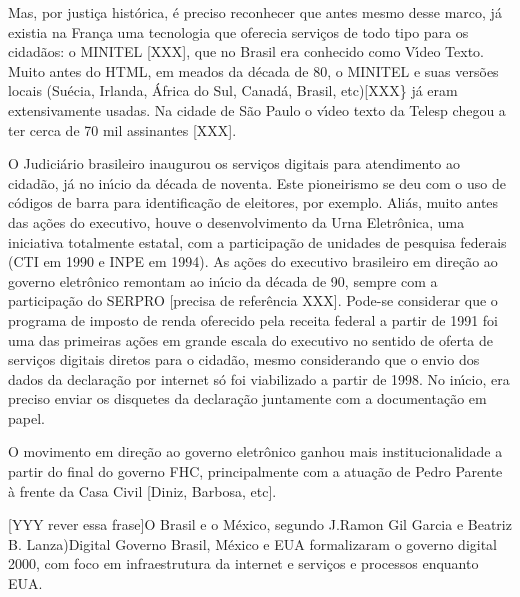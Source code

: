 \documentclass[
12pt,		%
openright,	%
twoside,  %
a4paper,			%
chapter=TITLE,		%
english,			%
french,				%
spanish,			%
brazil				%
]{USPSC-classe/USPSC_RedarTex}
\begin{document}
Mas, por justi\c{c}a hist\'orica, \'e preciso reconhecer que antes mesmo desse marco, j\'a existia na Fran\c{c}a uma tecnologia que oferecia servi\c{c}os de todo tipo para os cidad\~aos: o MINITEL [XXX], que no Brasil era conhecido como V\'{\i}deo Texto. Muito antes do HTML, em meados da d\'ecada de 80, o MINITEL e suas vers\~oes locais (Su\'ecia, Irlanda, \'Africa do Sul, Canad\'a, Brasil, etc)[XXX\} j\'a eram extensivamente usadas. Na cidade de S\~ao Paulo o v\'{\i}deo texto da Telesp chegou a ter cerca de 70 mil assinantes [XXX].








O Judici\'ario brasileiro inaugurou os servi\c{c}os digitais para atendimento ao cidad\~ao, j\'a no in\'{\i}cio da d\'ecada de noventa. Este pioneirismo se deu com o uso de c\'odigos de barra para identifica\c{c}\~ao de eleitores, por exemplo. Ali\'as, muito antes das a\c{c}\~oes do executivo, houve o desenvolvimento da Urna Eletr\^onica, uma iniciativa totalmente estatal, com a participa\c{c}\~ao de unidades de pesquisa federais (CTI em 1990 e INPE em 1994). As a\c{c}\~oes do executivo brasileiro em dire\c{c}\~ao ao governo eletr\^onico remontam ao in\'{\i}cio da d\'ecada de 90, sempre com a participa\c{c}\~ao do SERPRO [precisa de refer\^encia XXX]. Pode-se considerar que o programa de imposto de renda oferecido pela receita federal a partir de 1991 foi uma das primeiras a\c{c}\~oes em grande escala do executivo no sentido de oferta de servi\c{c}os digitais diretos para o cidad\~ao, mesmo considerando que o envio dos dados da declara\c{c}\~ao por internet s\'o foi viabilizado a partir de 1998. No in\'{\i}cio, era preciso enviar os disquetes da declara\c{c}\~ao juntamente com a documenta\c{c}\~ao em papel.








O movimento em dire\c{c}\~ao ao governo eletr\^onico ganhou mais institucionalidade a partir do final do governo FHC, principalmente com a atua\c{c}\~ao de Pedro Parente \`a frente da Casa Civil [Diniz, Barbosa, etc].








[YYY rever essa frase]O Brasil e o M\'exico, segundo J.Ramon Gil Garcia e Beatriz B. Lanza)Digital Governo Brasil, M\'exico e EUA formalizaram o governo digital 2000, com foco em infraestrutura da internet e servi\c{c}os e processos enquanto EUA.
\end{document}
